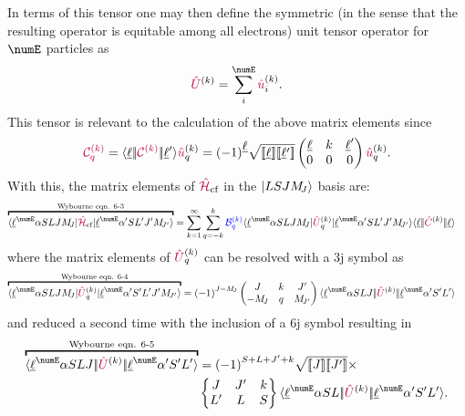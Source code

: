 \documentclass[11pt, twoside,openright]{article}
\begin{document}
    In terms of this tensor one may then define the symmetric (in the sense that the resulting operator is equitable among all electrons) unit tensor operator for $\numE$ particles as
    \begin{equation}
        \op{U}^{(k)} = \sum_{i}^{\numE} \op{u}^{(k)}_i.
    \end{equation}
    This tensor is relevant to the calculation of the above matrix elements since 
    \begin{equation}
        \textcolor{purple}{\mathcal{C}^{(k)}_{q}} = \langle \underbar{$\ell$}|\!|\textcolor{purple}{\mathcal{C}^{(k)}}|\!|\underbar{$\ell$}{'}\rangle \textcolor{purple}{\hat{u}}^{(k)}_q 
            = {(-1)}^{\underbar{$\ell$}}
            \sqrt{[\![\underbar{$\ell$}]\!][\![\underbar{$\ell$}{'}]\!]}
            \begin{pmatrix} \underbar{$\ell$} & k & \underbar{$\ell$}' \\ 0 & 0 & 0 \end{pmatrix} \textcolor{purple}{\hat{u}}^{(k)}_q.
    \end{equation}
    With this, the matrix elements of $\textcolor{purple}{\hat{\mathcal{H}}}_\text{cf}$ in the $|LSJM_{\!{J}}\rangle$ basis are: 
    \begin{align}
        \overbracket{\braopket{\lorb^\numE \alpha SLJ \Msub{J}}{\hamCrystalFieldSymbol}{\lorb^\numE \alpha'S L' J' \Msub{J'}}}^{\text{Wybourne eqn. 6-3}} &= \sum_{k=1}^\infty\sum_{q=-k}^k    
        \Bcomplexkq{k}{q} 
            \braopket{\lorb^\numE \alpha SLJ\Msub{J}}
                {\op{U}^{(k)}_q}
                {\lorb^\numE \alpha'SL'J'\Msub{J'}} 
            \redbraopket{\lorb}
                {\op{C}^{(k)}}
                {\lorb} 
    \label{HCFsum}
    \end{align}
    where the matrix elements of $\textcolor{purple}{\hat{U}}^{(k)}_q$ can be resolved with a 3j symbol as
    \begin{align}
        \overbracket{\braopket{\lorb^\numE \alpha S L J \Msub{J}}
            {\op{U}^{(k)}_q}
            {\lorb^\numE \alpha' S' L' J' \Msub{J'}}}^
            {\text{Wybourne eqn. 6-4}}
            &= 
            \phaser{J-\Msub{J}}
            \threej{J}{k}{J'}
                {-\Msub{J}}{q}{\Msub{J'}}
        \redbraopket{\lorb^\numE \alpha S L J}
                {\op{U}^{(k)}}
                {\lorb^\numE \alpha' S' L'}
    \end{align}
    and reduced a second time with the inclusion of a 6j symbol resulting in
    \begin{align}
        \nonumber \overbracket{\redbraopket{\lorb^\numE \alpha S L J}
            {\op{U}^{(k)}}
            {\lorb^\numE \alpha' S' L'}}^
            {\text{Wybourne eqn. 6-5}}
        &= 
        \phaser{S+L+J'+k} 
        \sqrt{\tpobraket{J}\tpobraket{J'}} \times \\
        & \sixj{J}{J'}{k}{L'}{L}{S}
        \redbraopket{\lorb^\numE \alpha S L}
            {\op{U}^{(k)}}
            {\lorb^\numE \alpha' S' L'}.
    \end{align}
\end{document}
